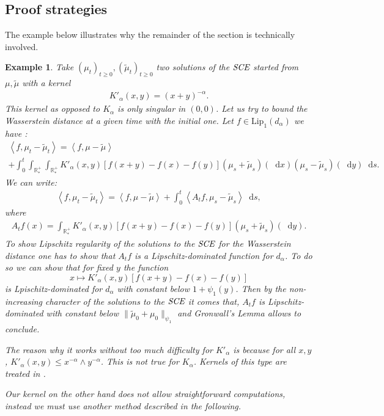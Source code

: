 \documentclass[11pt,a4paper]{article}
\newcommand{\RRP}{\mathbb{R}^+_*}
\newcommand{\SCE}{\emph{SCE}}
\newcommand{\Proc}[1]{\left(#1\right)_{t\geq 0}}
\newcommand{\brac}[1]{\left\langle#1\right\rangle}
\newcommand{\dd}{\mathop{}\!\mathrm{d}}
\newtheorem{example}[theorem]{Example}
\begin{document}
\subsection{Proof strategies}\label{section:wass-outline}
The example below illustrates why the remainder of the section is technically involved.
\begin{example}\label{exp:wasserstein-is-tricky}
    Take $\Proc{\mu_t} , \Proc{\tilde{\mu}_t}$ two solutions of the $\SCE$ started from $\mu,\tilde{\mu}$ with a kernel
    \begin{align*}
        K'_\alpha(x,y) = (x+y)^{-\alpha} .
    \end{align*}
    This kernel as opposed to $K_\alpha$ is only singular in $(0,0)$. Let us try to bound the Wasserstein distance at a given time with the initial one. Let $f \in \text{Lip}_1(d_\alpha)$ we have :
    \begin{multline*}
        \brac{f,\mu_t - \tilde{\mu}_t} = \brac{f,\mu - \tilde{\mu}} \\
        + \int_0^t \int_{\RRP}\int_{\RRP} K'_\alpha(x,y) \left[f(x+y) - f(x) -f(y) \right]\left(\mu_s + \tilde{\mu}_s\right)(\dd x) \left( \mu_s - \tilde{\mu}_s\right)(\dd y)\dd s.
    \end{multline*}
    We can write:
    \begin{align*}
        \brac{f,\mu_t - \tilde{\mu}_t} = \brac{f,\mu - \tilde{\mu}} + \int_0^t \brac{A_tf , \mu_s - \tilde{\mu}_s} \dd s,
    \end{align*}
    where
    \begin{align*}
        A_tf(x) = \int_{\RRP} K'_\alpha(x,y) \left[f(x+y) - f(x) -f(y) \right]\left(\mu_s + \tilde{\mu}_s\right)(\dd y).
    \end{align*}
    To show Lipschitz regularity of the solutions to the $\SCE$ for the Wasserstein distance one has to show that $A_tf$ is a Lipschitz-dominated function for $d_{\alpha}$. To do so we can show that for fixed $y$ the function 
    \[x \mapsto K'_\alpha(x,y) \left[f(x+y) - f(x) -f(y) \right]\]
    is Lpischitz-dominated for $d_{\alpha}$ with constant below $1 + \psi_1(y)$. Then by the non-increasing character of the solutions to the $\SCE$ it comes that, $A_tf$ is Lipschitz-dominated with constant below $\|\tilde{\mu}_0 + \mu_0 \|_{\psi_1}$ and Gronwall's Lemma allows to conclude.
     
    The reason why it works without too much difficulty for $K'_\alpha$ is because for all $x,y$, $K'_\alpha(x,y) \leq x^{-\alpha} \wedge y^{-\alpha}$. This is not true for $K_\alpha$. Kernels of this type are treated in \cite{cepedaSmoluchowskisEquationRate2011a,fournierStochasticCoalescenceHomogeneouslike2009}. 

    Our kernel on the other hand does not allow straightforward computations, instead we must use another method described in the following.
\end{example}
\end{document}
